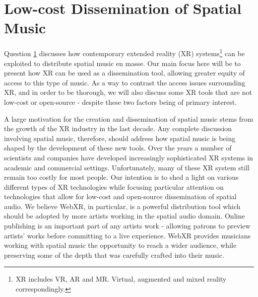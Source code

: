 \chapter{Low-cost Dissemination of Spatial Music}
\label{ch:xr-mus}


Question \ref{ch:xr-mus} discusses how contemporary extended reality (XR) systems\footnote{XR includes VR, AR and MR. Virtual, augmented and mixed reality correspondingly.} can be exploited to distribute spatial music en masse. Our main focus here will be to present how XR can be used as a dissemination tool, allowing greater equity of access to this type of music. As a way to contrast the access issues surrounding XR, and in order to be thorough, we will also discuss some XR tools that are not low-cost or open-source - despite these two factors being of primary interest.


A large motivation for the creation and dissemination of spatial music stems from the growth of the XR industry in the last decade. Any complete discussion involving spatial music, therefore, should address how spatial music is being shaped by the development of these new tools. Over the years a number of scientists and companies have developed increasingly sophisticated XR systems in academic and commercial settings. Unfortunately, many of these XR system still remain too costly for most people. 
Our intention is to shed a light on various different types of XR technologies while focusing particular attention on technologies that allow for low-cost and open-source dissemination of spatial audio. We believe WebXR, in particular, is a powerful distribution tool which should be adopted by more artists working in the spatial audio domain. Online publishing is an important part of any artists work - allowing patrons to preview artists' works before committing to a live experience. WebXR provides musicians working with spatial music the opportunity to reach a wider audience, while preserving some of the depth that was carefully crafted into their music.

